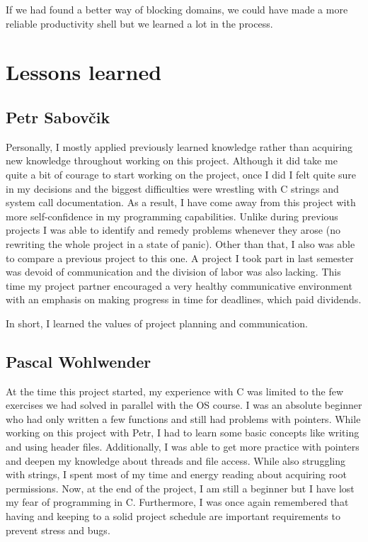 \documentclass{article}
\begin{document}
If we had found a better way of blocking domains, we could have made a more reliable productivity shell but we learned a lot in the process.

\section{Lessons learned}
\subsection{Petr Sabovčik}

Personally, I mostly applied previously learned knowledge rather than acquiring new knowledge throughout working on this project. Although it did take me quite a bit of courage to start working on the project, once I did I felt quite sure in my decisions and the biggest difficulties were wrestling with C strings and system call documentation. As a result, I have come away from this project with more self-confidence in my programming capabilities. Unlike during previous projects I was able to identify and remedy problems whenever they arose (no rewriting the whole project in a state of panic). Other than that, I also was able to compare a previous project to this one. A project I took part in last semester was devoid of communication and the division of labor was also lacking. This time my project partner encouraged a very healthy communicative environment with an emphasis on making progress in time for deadlines, which paid dividends.

In short, I learned the values of project planning and communication.


\subsection{Pascal Wohlwender}

At the time this project started, my experience with C was limited to the few exercises we had solved in parallel with the OS course. I was an absolute beginner who had only written a few functions and still had problems with pointers. While working on this project with Petr, I had to learn some basic concepts like writing and using header files. Additionally, I was able to get more practice with pointers and deepen my knowledge about threads and file access. While also struggling with strings, I spent most of my time and energy reading about acquiring root permissions. Now, at the end of the project, I am still a beginner but I have lost my fear of programming in C. Furthermore, I was once again remembered that having and keeping to a solid project schedule are important requirements to prevent stress and bugs.
\end{document}
